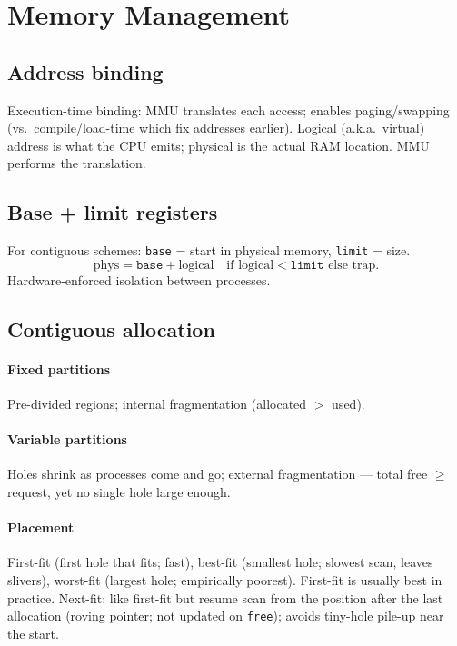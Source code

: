 \section{Memory Management}

\subsection{Address binding}
\textcolor{Bittersweet}{Execution-time binding}: MMU translates each access; enables paging/swapping (vs.\ compile/load-time which fix addresses earlier).
\textcolor{Bittersweet}{Logical} (a.k.a.\ virtual) address is what the CPU emits; \textcolor{Bittersweet}{physical} is the actual RAM location. MMU performs the translation.

\subsection{Base + limit registers}
For contiguous schemes: \texttt{base} = start in physical memory, \texttt{limit} = size.
\[\text{phys}=\texttt{base}+\text{logical}\quad\text{if logical}<\texttt{limit}\text{ else trap.}\]
Hardware-enforced isolation between processes.

\subsection{Contiguous allocation}
\paragraph{Fixed partitions} Pre-divided regions; \textcolor{Bittersweet}{internal fragmentation} (allocated $>$ used).
\paragraph{Variable partitions} Holes shrink as processes come and go; \textcolor{Bittersweet}{external fragmentation} — total free $\ge$ request, yet no single hole large enough.
\paragraph{Placement} \textcolor{Bittersweet}{First-fit} (first hole that fits; fast), \textcolor{Bittersweet}{best-fit} (smallest hole; slowest scan, leaves slivers), \textcolor{Bittersweet}{worst-fit} (largest hole; empirically poorest). First-fit is usually best in practice. \textcolor{Bittersweet}{Next-fit}: like first-fit but resume scan from the position after the last allocation (roving pointer; not updated on \texttt{free}); avoids tiny-hole pile-up near the start.
